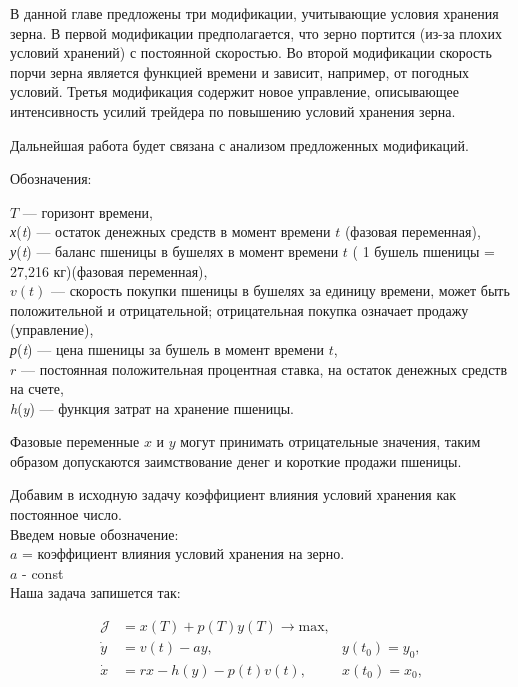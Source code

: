 В данной главе предложены три модификации, учитывающие условия хранения зерна. В первой модификации предполагается, что зерно портится (из-за плохих условий хранений) с постоянной скоростью. Во второй модификации скорость порчи зерна является функцией времени и зависит, например, от погодных условий. Третья модификация содержит новое управление, описывающее интенсивность усилий трейдера по повышению условий хранения зерна.

Дальнейшая работа будет связана с анализом предложенных модификаций.


Обозначения:\\
{\begin{math} T \end{math} --- горизонт времени,\\
\emph {х}(\emph{t}) --- остаток денежных средств в момент времени $t$ (фазовая переменная),\\
\emph {у}(\emph{t})  --- баланс пшеницы в бушелях в момент времени $t$ ( 1 бушель пшеницы = 27,216 кг)(фазовая переменная),\\ 
${v(t)}$ --- скорость покупки пшеницы в бушелях за единицу времени, может быть положительной и отрицательной; отрицательная покупка означает продажу (управление),\\
\emph {р}(\emph{t}) --- цена пшеницы за бушель в момент времени $t$,\\
${r}$ --- постоянная положительная процентная ставка, на остаток денежных средств на счете,\\
\emph {h}(\emph{y}) --- функция затрат на хранение пшеницы.
 
Фазовые переменные $x$ и $y$ могут принимать отрицательные значения, таким образом допускаются заимствование денег и короткие продажи пшеницы.


Добавим в исходную задачу коэффициент влияния условий хранения как постоянное число.\\

Введем новые обозначение:\\
${a}$ = коэффициент влияния условий хранения на зерно.\\
$a$ - const\\
Наша задача запишется так:

\begin{align}
\mathcal{J} & = x(T) + p(T) y(T) \to \mathrm{max},\\
    \Dot{y} & = v(t) - a y, & y(t_{0}) = y_{0}, \\
    \Dot{x} & = r x - h(y) - p(t) v(t), & x(t_{0}) = x_{0}, 
\end{align}

}
